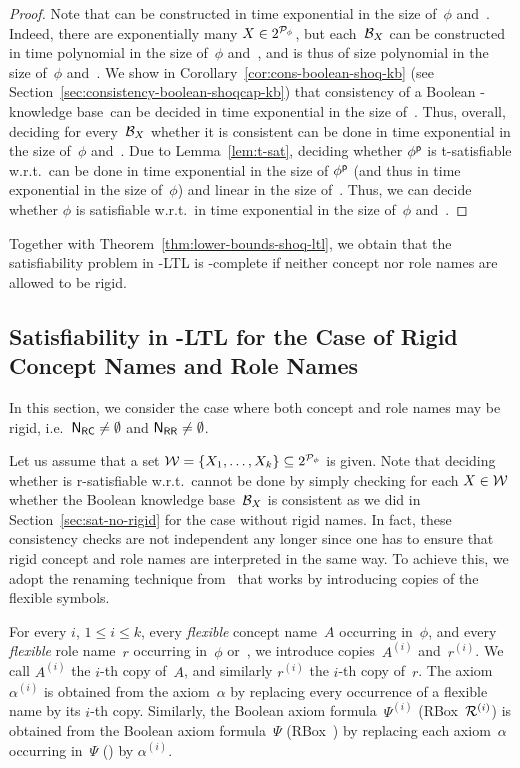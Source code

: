 \begin{proof}
    Note that \Wmc can be constructed in time exponential in the size of~$\phi$
    and~\Rmc.  Indeed, there are exponentially many $X\in 2^{\mathcal{P}_\phi}$, but
    each~$\mathcal{B}_X$ can be constructed in time polynomial in the size of~$\phi$
    and~\Rmc, and is thus of size polynomial in the size of~$\phi$ and~\Rmc.  We
    show in Corollary~\ref{cor:cons-boolean-shoq-kb} (see
    Section~\ref{sec:consistency-boolean-shoqcap-kb}) that consistency of a
    Boolean \SHOQ-knowledge base~\Bmc can be decided in time exponential in the
    size of~\Bmc.  Thus, overall, deciding for every~$\mathcal{B}_X$ whether it is
    consistent can be done in time exponential in the size of~$\phi$ and~\Rmc.
    Due to Lemma~\ref{lem:t-sat}, deciding whether $\phi^\mathsf{p}$ is t-satisfiable
    w.r.t.~\Wmc can be done in time exponential in the size of $\phi^\mathsf{p}$ (and
    thus in time exponential in the size of~$\phi$) and linear in the size
    of~\Wmc.  Thus, we can decide whether $\phi$ is satisfiable w.r.t.~\Rmc in
    time exponential in the size of~$\phi$ and~\Rmc.
\end{proof}

\noindent
Together with Theorem~\ref{thm:lower-bounds-shoq-ltl}, we obtain that the
satisfiability problem in \SHOQ-LTL is \ExpTime-complete if neither concept nor
role names are allowed to be rigid.


\subsection{Satisfiability in \texorpdfstring{\SHOQ-LTL}{SHOQ-LTL} for the Case of Rigid Concept Names and Role Names}\label{sec:sat-rigid}

In this section, we consider the case where both concept and role names may be
rigid, i.e.~$\mathsf{N_{RC}}\ne\emptyset$ and $\mathsf{N_{RR}}\ne\emptyset$.

Let us assume that a set $\mathcal{W}=\{X_1,\dots,X_k\}\subseteq 2^{\mathcal{P}_\phi}$ is
given.  Note that deciding whether \Wmc is r-satisfiable w.r.t.~\Rmc cannot be
done by simply checking for each $X\in\mathcal{W}$ whether the Boolean knowledge
base~$\mathcal{B}_X$ is consistent as we did in Section~\ref{sec:sat-no-rigid} for the
case without rigid names.  In fact, these consistency checks are not independent
any longer since one has to ensure that rigid concept and role names are
interpreted in the same way.  To achieve this, we adopt the renaming technique
from~\cite{BaGL-ToCL12} that works by introducing copies of the flexible
symbols.

For every $i$, $1\le i\le k$, every \emph{flexible} concept name~$A$ occurring
in~$\phi$, and every \emph{flexible} role name~$r$ occurring in~$\phi$ or~\Rmc,
we introduce copies~$A^{(i)}$ and~$r^{(i)}$.  We call $A^{(i)}$ the $i$-th
copy of~$A$, and similarly $r^{(i)}$ the $i$-th copy of~$r$.  The
axiom~$\alpha^{(i)}$ is obtained from the axiom~$\alpha$ by replacing every
occurrence of a flexible name by its $i$-th copy.  Similarly, the Boolean axiom
formula~$\Psi^{(i)}$ (RBox~$\mathcal{R}^{(i)}$) is obtained from the Boolean axiom
formula~$\Psi$ (RBox~\Rmc) by replacing each axiom~$\alpha$ occurring in~$\Psi$
(\Rmc) by $\alpha^{(i)}$.

